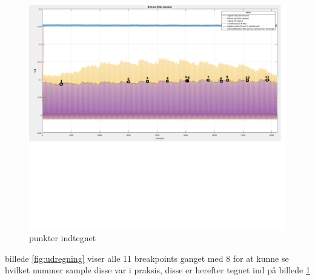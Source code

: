 \documentclass{article}
\begin{document}
\begin{figure}[h!]
  \centering
  \includegraphics[width=1.0\textwidth]{billeder/punkter.png}
  \caption{punkter indtegnet}
  \label{fig:punkter}
\end{figure}

billede \ref{fig:udregning} viser alle 11 breakpoints ganget med 8 for at kunne se hvilket nummer sample disse var i praksis, disse er herefter tegnet ind på billede \ref{fig:punkter} 
\end{document}
